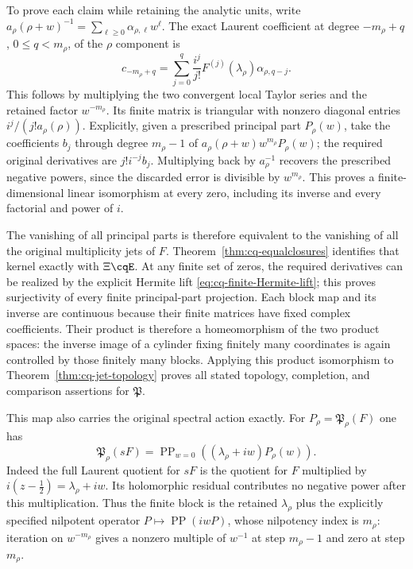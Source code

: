 To prove each claim while retaining the analytic units, write
$a_\rho(\rho+w)^{-1}=\sum_{\ell\geq0}\alpha_{\rho,\ell}w^\ell$.
The exact Laurent coefficient at degree $-m_\rho+q$, $0\leq q<m_\rho$,
of the $\rho$ component is
\begin{equation}\label{eq:cq-principalpart-coefficients}
 c_{-m_\rho+q}
 =\sum_{j=0}^{q}\frac{i^j}{j!}F^{(j)}(\lambda_\rho)
                                  \alpha_{\rho,q-j}.
\end{equation}
This follows by multiplying the two convergent local Taylor
series and the retained factor $w^{-m_\rho}$. Its finite matrix
is triangular with nonzero diagonal entries
$i^j/(j!a_\rho(\rho))$. Explicitly, given a prescribed principal
part $P_\rho(w)$, take the coefficients $b_j$ through degree
$m_\rho-1$ of $a_\rho(\rho+w)w^{m_\rho}P_\rho(w)$;
the required original derivatives are $j!i^{-j}b_j$.
Multiplying back by $a_\rho^{-1}$ recovers the prescribed negative
powers, since the discarded error is divisible by $w^{m_\rho}$.
This proves a finite-dimensional linear isomorphism at every zero,
including its inverse and every factorial and power of $i$.

The vanishing of all principal parts is therefore equivalent to
the vanishing of all the original multiplicity jets of $F$.
Theorem~\ref{thm:cq-equalclosures} identifies that kernel exactly
with $\Xi\cqE$. At any finite set of zeros, the required derivatives
can be realized by the explicit Hermite lift
\eqref{eq:cq-finite-Hermite-lift}; this proves surjectivity of
every finite principal-part projection. Each block map and its
inverse are continuous because their finite matrices have fixed
complex coefficients. Their product is therefore a homeomorphism
of the two product spaces: the inverse image of a cylinder fixing
finitely many coordinates is again controlled by those finitely
many blocks. Applying this product isomorphism to
Theorem~\ref{thm:cq-jet-topology} proves all stated topology,
completion, and comparison assertions for $\mathfrak P$.

This map also carries the original spectral action exactly. For
$P_\rho=\mathfrak P_\rho(F)$ one has
\begin{equation}\label{eq:cq-s-principalparts}
 \mathfrak P_\rho(sF)
 =\operatorname{PP}_{w=0}
                  ((\lambda_\rho+iw)P_\rho(w)).
\end{equation}
Indeed the full Laurent quotient for $sF$ is the quotient for $F$
multiplied by $i(z-\tfrac12)=\lambda_\rho+iw$.
Its holomorphic residual contributes no negative power after this
multiplication. Thus the finite block is the retained
$\lambda_\rho$ plus the explicitly specified nilpotent operator
$P\mapsto\operatorname{PP}(iwP)$, whose nilpotency index is
$m_\rho$: iteration on $w^{-m_\rho}$ gives a nonzero multiple
of $w^{-1}$ at step $m_\rho-1$ and zero at step $m_\rho$.

